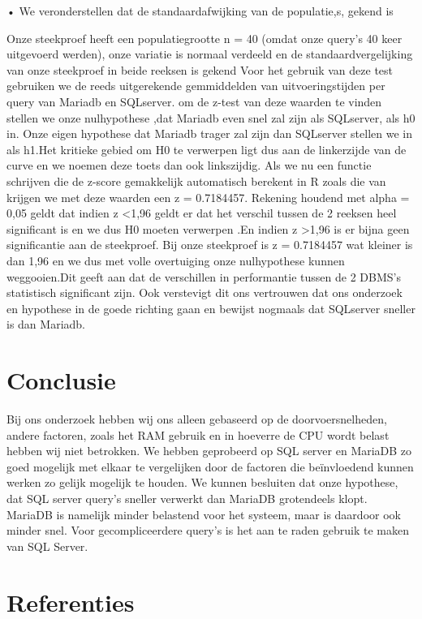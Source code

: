 \documentclass[fleqn,10pt]{artikeltin}
\begin{document}
•  We veronderstellen dat de standaardafwijking van de populatie,s, gekend is

\vspace{5mm} %

Onze steekproef heeft een populatiegrootte n = 40 (omdat onze query's 40 keer uitgevoerd werden), onze variatie is normaal verdeeld en de standaardvergelijking van onze steekproef in beide reeksen is gekend
Voor het gebruik van deze test gebruiken we de reeds uitgerekende gemmiddelden van uitvoeringstijden per query van Mariadb en SQLserver. om de z-test van deze waarden te vinden stellen we onze nulhypothese ,dat Mariadb even snel zal zijn als SQLserver, als h0 in. Onze eigen hypothese dat Mariadb trager zal zijn dan SQLserver stellen we in als h1.Het kritieke gebied om H0 te verwerpen ligt dus aan de linkerzijde van de curve en we noemen deze toets dan ook linkszijdig. Als we nu een functie schrijven die de z-score gemakkelijk automatisch berekent in R zoals die van ~\textcite{Lobos2009} krijgen we met deze waarden een z = 0.7184457. Rekening houdend met alpha  = 0,05 geldt dat
indien \textbar z \textbar \textless 1,96 geldt er dat het verschil tussen de 2 reeksen heel significant is en we dus H0 moeten verwerpen .En indien \textbar z \textbar \textgreater 1,96 is er bijna geen significantie aan de steekproef. Bij onze steekproef is z = 0.7184457 wat kleiner is dan 1,96 en we dus met volle overtuiging onze nulhypothese kunnen weggooien.Dit geeft aan dat de verschillen in performantie tussen de 2 DBMS's statistisch significant zijn. Ook verstevigt dit ons vertrouwen dat ons onderzoek en hypothese in de goede richting gaan en bewijst nogmaals dat SQLserver sneller is dan Mariadb.
\section{Conclusie}
\label{sec:conclusie}
Bij ons onderzoek hebben wij ons alleen gebaseerd op de doorvoersnelheden, andere factoren, zoals het RAM gebruik en in hoeverre de CPU wordt belast hebben wij niet betrokken. We hebben geprobeerd op SQL server en MariaDB zo goed mogelijk met elkaar te vergelijken door de factoren die beïnvloedend kunnen werken zo gelijk mogelijk te houden. We kunnen besluiten dat onze hypothese, dat SQL server query’s sneller verwerkt dan MariaDB grotendeels klopt. MariaDB is namelijk minder belastend voor het systeem, maar is daardoor ook minder snel. Voor gecompliceerdere query’s is het aan te raden gebruik te maken van SQL Server.
\section{Referenties}
\label{sec:referenties}
\end{document}
